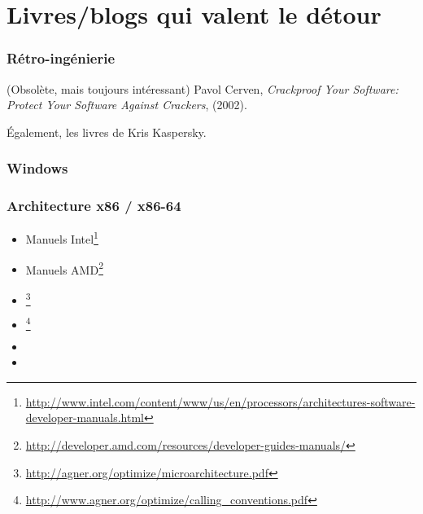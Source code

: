\chapter{Livres/blogs qui valent le détour}


\subsection{Rétro-ingénierie}



(Obsolète, mais toujours intéressant) Pavol Cerven, \emph{Crackproof Your Software: Protect Your Software Against Crackers}, (2002).

Également, les livres de Kris Kaspersky.

\subsection{Windows}



\subsection{\CCpp}



\subsection{Architecture x86 / x86-64}

\label{x86_manuals}
\begin{itemize}
\item Manuels Intel\footnote{\AlsoAvailableAs \url{http://www.intel.com/content/www/us/en/processors/architectures-software-developer-manuals.html}}

\item Manuels AMD\footnote{\AlsoAvailableAs \url{http://developer.amd.com/resources/developer-guides-manuals/}}

\item \AgnerFog{}\footnote{\AlsoAvailableAs \url{http://agner.org/optimize/microarchitecture.pdf}}

\item \AgnerFogCC{}\footnote{\AlsoAvailableAs \url{http://www.agner.org/optimize/calling_conventions.pdf}}

\item \IntelOptimization

\item \AMDOptimization
\end{itemize}

